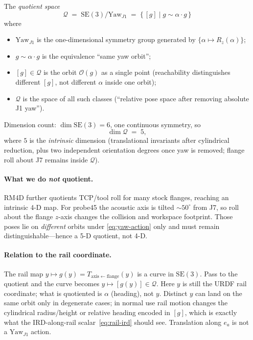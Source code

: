 \documentclass[11pt,a4paper]{article}
\newcommand{\SE}{\mathrm{SE}}
\begin{document}
The \emph{quotient space}
\begin{equation}
\label{eq:quotient-def}
  \mathcal{Q}
  \;=\;
  \SE(3)/\mathrm{Yaw}_{J1}
  \;=\;
  \bigl\{\, [g]
  \;\big|\;
  g\sim \alpha\cdot g
  \,\bigr\}
\end{equation}
where
\begin{itemize}[leftmargin=1.4em]
  \item \(\mathrm{Yaw}_{J1}\) is the one-dimensional symmetry group generated
        by \(\{\alpha\mapsto R_{z}(\alpha)\}\);
  \item \(g\sim \alpha\cdot g\) is the equivalence ``same yaw orbit'';
  \item \([g]\in\mathcal{Q}\) is the orbit \(\mathcal{O}(g)\) as a single
        point (reachability distinguishes different \([g]\), not different
        \(\alpha\) inside one orbit);
  \item \(\mathcal{Q}\) is the space of all such classes (``relative pose
        space after removing absolute J1 yaw'').
\end{itemize}
Dimension count: \(\dim\SE(3)=6\), one continuous symmetry, so
\begin{equation}
\label{eq:quotient-dim}
  \dim\mathcal{Q}
  \;=\;
  5,
\end{equation}
where \(5\) is the \emph{intrinsic} dimension (translational invariants after
cylindrical reduction, plus two independent orientation degrees once yaw is
removed; flange roll about J7 remains inside \(\mathcal{Q}\)).

\paragraph{What we do \emph{not} quotient.}
RM4D further quotients TCP/tool roll for many stock flanges, reaching an
intrinsic 4-D map. For probe45 the acoustic axis is tilted \(\sim 50^{\circ}\)
from J7, so roll about the flange \(z\)-axis changes the collision and
workspace footprint. Those poses lie on \emph{different} orbits under
\eqref{eq:yaw-action} only and must remain distinguishable---hence a 5-D
quotient, not 4-D.

\paragraph{Relation to the rail coordinate.}
The rail map \(y\mapsto g(y)=T_{\mathrm{axis\leftarrow flange}}(y)\) is a
curve in \(\SE(3)\). Pass to the quotient and the curve becomes
\(y\mapsto [g(y)]\in\mathcal{Q}\).
Here \(y\) is still the URDF rail coordinate; what is quotiented is
\(\alpha\) (heading), not \(y\). Distinct \(y\) can land on the same orbit
only in degenerate cases; in normal use rail motion changes the cylindrical
radius/height or relative heading encoded in \([g]\), which is exactly what
the IRD-along-rail scalar~\eqref{eq:rail-ird} should see. Translation along
\(e_{a}\) is not a \(\mathrm{Yaw}_{J1}\) action.
\end{document}
